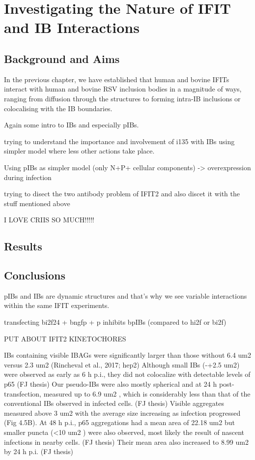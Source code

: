 \chapter{Investigating the Nature of IFIT and IB Interactions} \label{ch:Investigating the Nature of IFIT and IB Interactions}
\section{Background and Aims} \label{sec:Background and Aims-Chapter4}


In the previous chapter, we have established that human and bovine IFITs interact with human and bovine RSV inclusion bodies in a magnitude of ways, ranging from diffusion through the structures to forming intra-IB inclusions or colocalising with the IB boundaries. 


Again some intro to IBs and especially pIBs.

trying to understand the importance and involvement of i135 with IBs using simpler model where less other actions take place. 

Using pIBs as simpler model (only N+P+ cellular components) -> overexpression during infection

trying to disect the two antibody problem of IFIT2 and also discet it with the stuff mentioned above

I LOVE CRIIS SO MUCH!!!!!

\section{Results} \label{sec:Results-Chapter4}



\section{Conclusions} \label{sec:Conclusions-Chapter4}
pIBs and IBs are dynamic structures and that's why we see variable interactions within the same IFIT experiments.

transfecting bi2f24 + bngfp + p inhibits bpIBs (compared to hi2f or bi2f)



PUT ABOUT IFIT2 KINETOCHORES

IBs containing visible IBAGs were significantly larger than those without 6.4 um2 versus 2.3 um2 (Rincheval et al., 2017; hep2)
Although small IBs (-+2.5 um2) were observed as early as 6 h p.i., they did not colocalize with detectable levels of p65 (FJ thesis)
Our pseudo-IBs were also mostly spherical and at 24 h post-transfection, measured up to 6.9 um2 , which is considerably less than that of the conventional IBs observed in infected cells. (FJ thesis)
Visible aggregates measured above 3 um2 with the average size increasing as infection progressed (Fig 4.5B). At 48 h p.i., p65 aggregations had a mean area of 22.18 um2 but smaller puncta (<10 um2 ) were also observed, most likely the result of nascent infections in nearby cells. (FJ thesis)
Their mean area also increased to 8.99 um2 by 24 h p.i. (FJ thesis)

